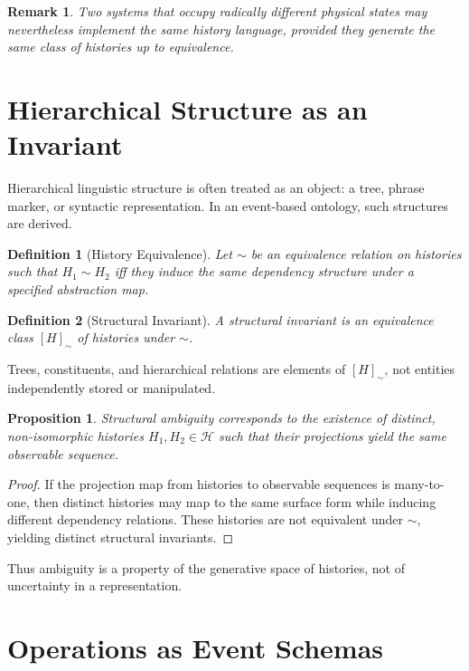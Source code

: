 \documentclass[11pt]{article}
\newtheorem{definition}{Definition}
\newtheorem{remark}{Remark}
\newtheorem{proposition}{Proposition}
\begin{document}
\begin{remark}
Two systems that occupy radically different physical states may nevertheless implement the same history language, provided they generate the same class of histories up to equivalence.
\end{remark}

\section{Hierarchical Structure as an Invariant}

Hierarchical linguistic structure is often treated as an object: a tree, phrase marker, or syntactic representation. In an event-based ontology, such structures are derived.

\begin{definition}[History Equivalence]
Let $\sim$ be an equivalence relation on histories such that $H_1 \sim H_2$ iff they induce the same dependency structure under a specified abstraction map.
\end{definition}

\begin{definition}[Structural Invariant]
A \emph{structural invariant} is an equivalence class $[H]_{\sim}$ of histories under $\sim$.
\end{definition}

Trees, constituents, and hierarchical relations are elements of $[H]_{\sim}$, not entities independently stored or manipulated.

\begin{proposition}
Structural ambiguity corresponds to the existence of distinct, non-isomorphic histories $H_1, H_2 \in \mathcal{H}$ such that their projections yield the same observable sequence.
\end{proposition}

\begin{proof}
If the projection map from histories to observable sequences is many-to-one, then distinct histories may map to the same surface form while inducing different dependency relations. These histories are not equivalent under $\sim$, yielding distinct structural invariants.
\end{proof}

Thus ambiguity is a property of the generative space of histories, not of uncertainty in a representation.

\section{Operations as Event Schemas}
\end{document}
